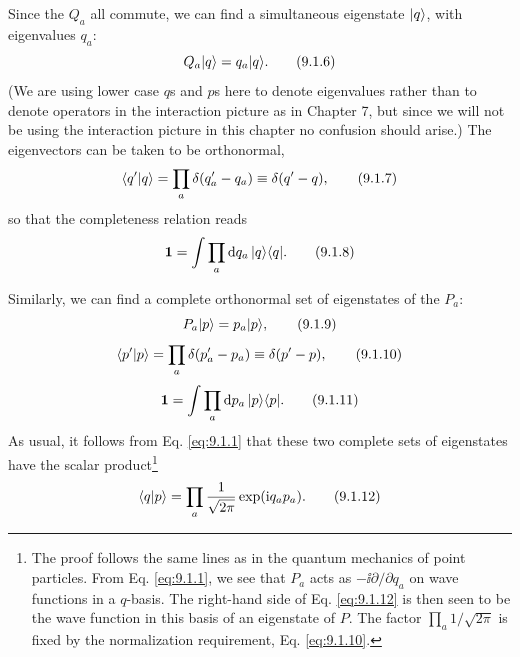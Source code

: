 Since the $Q_a$ all commute, we can find a simultaneous eigenstate
$\lvert q\rangle$, with eigenvalues $q_a$:
\begin{equation}
  Q_a\lvert q\rangle=q_a\lvert q\rangle.
  \tag{9.1.6}\label{eq:9.1.6}
\end{equation}
(We are using lower case $q$s and $p$s here to denote eigenvalues rather
than to denote operators in the interaction picture as in Chapter 7, but
since we will not be using the interaction picture in this chapter no
confusion should arise.) The eigenvectors can be taken to be orthonormal,
\begin{equation}
  \langle q' | q\rangle=\prod_a\delta(q'_a-q_a)\equiv\delta(q'-q),
  \tag{9.1.7}\label{eq:9.1.7}
\end{equation}
so that the completeness relation reads
\begin{equation}
  \mathbf{1}=\int\prod_a \mathop{}\!\mathrm{d} q_a\,\lvert q\rangle\langle q\rvert.
  \tag{9.1.8}\label{eq:9.1.8}
\end{equation}

Similarly, we can find a complete orthonormal set of eigenstates of the
$P_a$:
\begin{equation}
  P_a\lvert p\rangle=p_a\lvert p\rangle,
  \tag{9.1.9}\label{eq:9.1.9}
\end{equation}
\begin{equation}
  \langle p' | p\rangle=\prod_a\delta(p'_a-p_a)\equiv\delta(p'-p),
  \tag{9.1.10}\label{eq:9.1.10}
\end{equation}
\begin{equation}
  \mathbf{1}=\int\prod_a \mathop{}\!\mathrm{d} p_a\,\lvert p\rangle\langle p\rvert.
  \tag{9.1.11}\label{eq:9.1.11}
\end{equation}
As usual, it follows from Eq. \eqref{eq:9.1.1} that these two complete sets of
eigenstates have the scalar product\footnote{The proof follows the same lines
as in the quantum mechanics of point particles. From Eq. \eqref{eq:9.1.1}, we see
that $P_a$ acts as $-\ii\partial/\partial q_a$ on wave functions in a $q$-basis.
The right-hand side of Eq. \eqref{eq:9.1.12} is then seen to be the wave function in
this basis of an eigenstate of $P$. The factor $\prod_a1/\sqrt{2\pi}$ is fixed
by the normalization requirement, Eq. \eqref{eq:9.1.10}.}
\begin{equation}
  \langle q | p\rangle=\prod_a\frac{1}{\sqrt{2\pi}}\exp(\mathrm{i} q_ap_a).
  \tag{9.1.12}\label{eq:9.1.12}
\end{equation}

